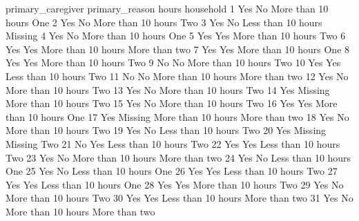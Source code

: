 \documentclass[
  letterpaper,
  DIV=11,
  numbers=noendperiod]{scrreprt}
\newenvironment{Shaded}{\begin{snugshade}}{\end{snugshade}}
\newcommand{\NormalTok}[1]{\textcolor[rgb]{0.00,0.23,0.31}{#1}}
\begin{document}
\begin{Shaded}
\begin{Highlighting}[]
\NormalTok{    primary\_caregiver primary\_reason              hours     household}
\NormalTok{1                 Yes             No More than 10 hours           One}
\NormalTok{2                 Yes             No More than 10 hours           Two}
\NormalTok{3                 Yes             No Less than 10 hours       Missing}
\NormalTok{4                 Yes             No More than 10 hours           One}
\NormalTok{5                 Yes            Yes More than 10 hours           Two}
\NormalTok{6                 Yes            Yes More than 10 hours More than two}
\NormalTok{7                 Yes            Yes More than 10 hours           One}
\NormalTok{8                 Yes            Yes More than 10 hours           Two}
\NormalTok{9                  No             No More than 10 hours           Two}
\NormalTok{10                Yes            Yes Less than 10 hours           Two}
\NormalTok{11                 No             No More than 10 hours More than two}
\NormalTok{12                Yes             No More than 10 hours           Two}
\NormalTok{13                Yes             No More than 10 hours           Two}
\NormalTok{14                Yes        Missing More than 10 hours           Two}
\NormalTok{15                Yes             No More than 10 hours           Two}
\NormalTok{16                Yes            Yes More than 10 hours           One}
\NormalTok{17                Yes        Missing More than 10 hours More than two}
\NormalTok{18                Yes             No More than 10 hours           Two}
\NormalTok{19                Yes             No Less than 10 hours           Two}
\NormalTok{20                Yes        Missing            Missing           Two}
\NormalTok{21                 No            Yes Less than 10 hours           Two}
\NormalTok{22                Yes            Yes Less than 10 hours           Two}
\NormalTok{23                Yes             No More than 10 hours More than two}
\NormalTok{24                Yes             No Less than 10 hours           One}
\NormalTok{25                Yes             No Less than 10 hours           One}
\NormalTok{26                Yes            Yes Less than 10 hours           Two}
\NormalTok{27                Yes            Yes Less than 10 hours           One}
\NormalTok{28                Yes            Yes More than 10 hours           Two}
\NormalTok{29                Yes             No More than 10 hours           Two}
\NormalTok{30                Yes            Yes Less than 10 hours More than two}
\NormalTok{31                Yes             No More than 10 hours More than two}

\end{Highlighting}
\end{Shaded}
\end{document}
